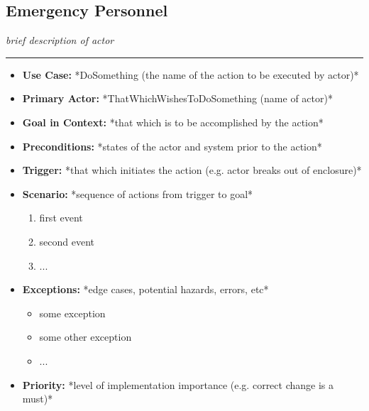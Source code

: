 \documentclass[12pt]{article}
\begin{document}
    \subsection{Emergency Personnel}
    \textit{brief description of actor}
    \par\noindent\rule{\textwidth}{0.4pt}    
    \begin{itemize}
        \item[]\textbf{Use Case:}                                
            *DoSomething (the name of the action to be executed by actor)*

        \item[]\textbf{Primary Actor:}
            *ThatWhichWishesToDoSomething (name of actor)*

        \item[]\textbf{Goal in Context:}
            *that which is to be accomplished by the action*

        \item[]\textbf{Preconditions:}
            *states of the actor and system prior to the action*

        \item[]\textbf{Trigger:}
            *that which initiates the action (e.g. actor breaks out of enclosure)*

        \item[]\textbf{Scenario:}
            *sequence of actions from trigger to goal*
            \begin{enumerate}
                \item first event
                \item second event
                \item ...
            \end{enumerate}

        \item[]\textbf{Exceptions:}
            *edge cases, potential hazards, errors, etc*
            \begin{itemize}
                \item[] some exception
                \item[] some other exception                
                \item[] ...
            \end{itemize}

        \item[]\textbf{Priority:}
            *level of implementation importance (e.g. correct change is a must)*


\end{itemize}
\end{document}
